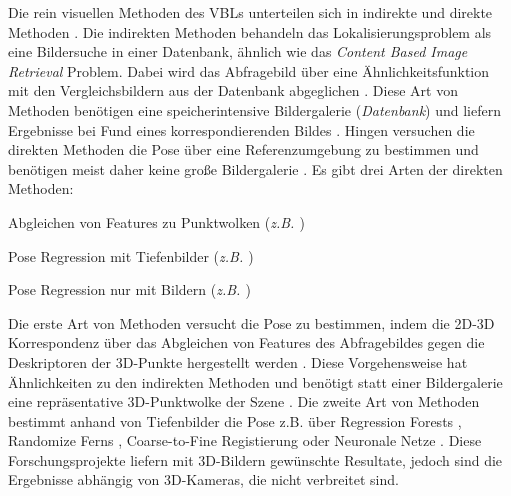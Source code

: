 Die rein visuellen Methoden des VBLs unterteilen sich in indirekte und direkte Methoden \cite{lowryVisualPlaceRecognition2016}. Die indirekten Methoden behandeln das Lokalisierungsproblem als eine Bildersuche in einer Datenbank, ähnlich wie das \textit{Content Based Image Retrieval} \cite{lewContentbasedMultimediaInformation2006} Problem. Dabei wird das Abfragebild über eine Ähnlichkeitsfunktion mit den Vergleichsbildern aus der Datenbank abgeglichen \cite{zhangImageBasedLocalization2006, arandjelovicThreeThingsEveryone2012, radenovicCNNImageRetrieval2016}. Diese Art von Methoden benötigen eine speicherintensive Bildergalerie (\textit{Datenbank}) und liefern Ergebnisse bei Fund eines korrespondierenden Bildes \cite{lowryVisualPlaceRecognition2016}. Hingen versuchen die direkten Methoden die Pose über eine Referenzumgebung zu bestimmen und benötigen meist daher keine große Bildergalerie  \cite{piascoSurveyVisualBasedLocalization2018}. Es gibt drei Arten der direkten Methoden: 
\begin{enumerate*}[label=\arabic*)]
	\item Abgleichen von Features zu Punktwolken (\textit{z.B. \cite{liWorldwidePoseEstimation2012}})
	\item Pose Regression mit Tiefenbilder (\textit{z.B. \cite{shottonSceneCoordinateRegression2013a}})
	\item Pose Regression nur mit Bildern (\textit{z.B. \cite{kendallPoseNetConvolutionalNetwork2015}})
\end{enumerate*}

Die erste Art von Methoden versucht die Pose zu bestimmen, indem die 2D-3D Korrespondenz über das Abgleichen von Features des Abfragebildes gegen die Deskriptoren der 3D-Punkte hergestellt werden \cite{irscharaStructurefrommotionPointClouds2009, liWorldwidePoseEstimation2012, svarmCityScaleLocalizationCameras2017}. Diese Vorgehensweise hat Ähnlichkeiten zu den indirekten Methoden und benötigt statt einer Bildergalerie eine repräsentative 3D-Punktwolke der Szene \cite{piascoSurveyVisualBasedLocalization2018}. Die zweite Art von Methoden bestimmt anhand von Tiefenbilder die Pose z.B. über Regression Forests \cite{shottonSceneCoordinateRegression2013a}, Randomize Ferns \cite{glockerRealTimeRGBDCamera2015}, Coarse-to-Fine Registierung \cite{santosMappingIndoorSpaces2016} oder Neuronale Netze \cite{massicetiRandomForestsNeural2016}. Diese Forschungsprojekte liefern mit 3D-Bildern gewünschte Resultate, jedoch sind die Ergebnisse abhängig von 3D-Kameras, die nicht verbreitet sind.

